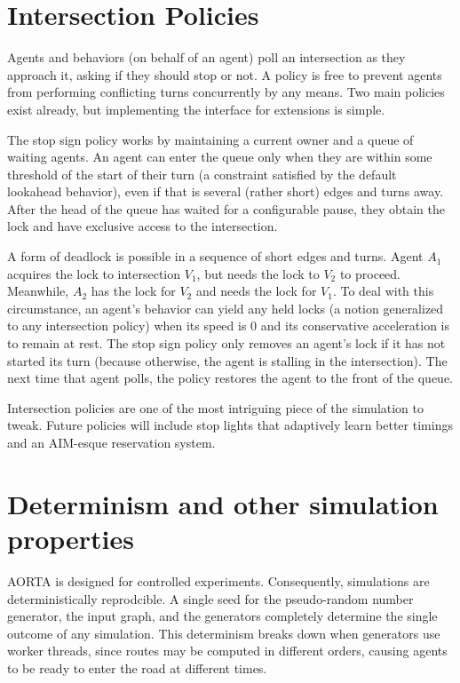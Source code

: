 \documentclass[letterpaper, 10 pt, conference]{ieeeconf}  %
\begin{document}
\section{Intersection Policies}

Agents and behaviors (on behalf of an agent) poll an intersection as they
approach it, asking if they should stop or not. A policy is free to prevent
agents from performing conflicting turns concurrently by any means. Two main
policies exist already, but implementing the interface for extensions is simple.

The stop sign policy works by maintaining a current owner and a queue of waiting
agents. An agent can enter the queue only when they are within some threshold of
the start of their turn (a constraint satisfied by the default lookahead
behavior), even if that is several (rather short) edges and turns away. After
the head of the queue has waited for a configurable pause, they obtain the lock
and have exclusive access to the intersection.

A form of deadlock is possible in a sequence of short edges and turns. Agent
$A_1$ acquires the lock to intersection $V_1$, but needs the lock to $V_2$ to
proceed. Meanwhile, $A_2$ has the lock for $V_2$ and needs the lock for $V_1$.
To deal with this circumstance, an agent's behavior can yield any held locks (a
notion generalized to any intersection policy) when its speed is $0$ and its
conservative acceleration is to remain at rest. The stop sign policy only
removes an agent's lock if it has not started its turn (because otherwise, the
agent is stalling in the intersection). The next time that agent polls, the
policy restores the agent to the front of the queue.


Intersection policies are one of the most intriguing piece of the simulation to
tweak. Future policies will include stop lights that adaptively learn better
timings and an AIM-esque reservation system.

\section{Determinism and other simulation properties}

AORTA is designed for controlled experiments. Consequently, simulations are
deterministically reprodcible. A single seed for the pseudo-random number
generator, the input graph, and the generators completely determine the single
outcome of any simulation. This determinism breaks down when generators use
worker threads, since routes may be computed in different orders, causing agents
to be ready to enter the road at different times.
\end{document}
